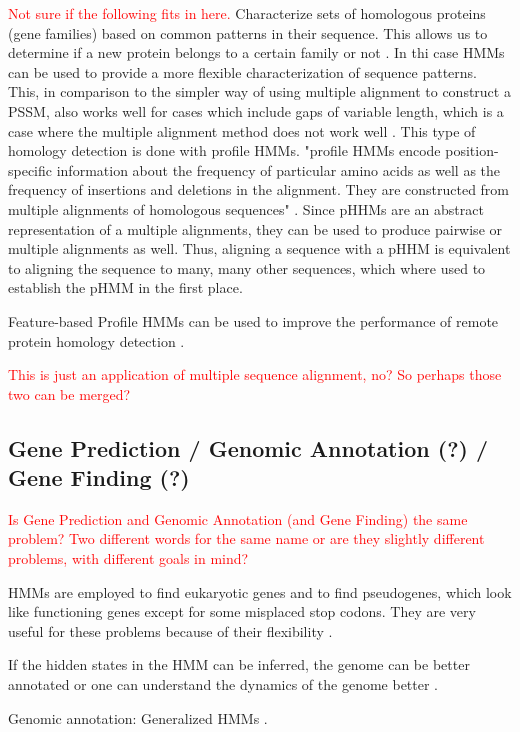 \documentclass{article}
\begin{document}
\textcolor{red}{Not sure if the following fits in here.}
Characterize sets of homologous proteins (gene families) based on common patterns in their sequence. This allows us to determine if a new protein belongs to a certain family or not \cite{Christianini2006}. In thi case HMMs can be used to provide a more flexible characterization of sequence patterns. This, in comparison to the simpler way of using multiple alignment to construct a PSSM, also works well for cases which include gaps of variable length, which is a case where the multiple alignment method does not work well \cite{Christianini2006}. This type of homology detection is done with profile HMMs. "proﬁle HMMs encode position-speciﬁc information about
the frequency of particular amino acids as well as the frequency of insertions
and deletions in the alignment. They are constructed from multiple alignments
of homologous sequences" \cite{Christianini2006}. Since pHHMs are an abstract representation of a multiple alignments, they can be used to produce pairwise or multiple alignments as well. Thus, aligning a sequence with a pHHM is equivalent to aligning the sequence to many, many other sequences, which where used to establish the pHMM in the first place. 

Feature-based Profile HMMs can be used to improve the performance of remote protein homology detection \cite{Yoon2009}.

\textcolor{red}{This is just an application of multiple sequence alignment, no? So perhaps those two can be merged?}


\subsection{Gene Prediction / Genomic Annotation (?) / Gene Finding (?)}
\textcolor{red}{Is Gene Prediction and Genomic Annotation (and Gene Finding) the same problem? Two different words for the same name or are they slightly different problems, with different goals in mind?}

HMMs are employed to find eukaryotic genes and to find pseudogenes, which look like functioning genes except for some misplaced stop codons. They are very useful for these problems because of their flexibility \cite{Christianini2006}.

If the hidden states in the HMM can be inferred, the genome can be better annotated or one can understand the dynamics of the genome better \cite{Christianini2006}.

Genomic annotation: Generalized HMMs \cite{Choo2004}.
\end{document}
